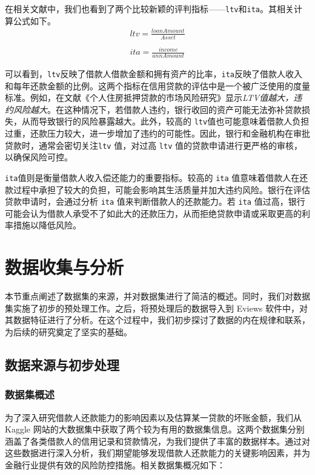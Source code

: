 \documentclass[13.5pt,hyperref,a4paper,UTF8]{ctexart}
\begin{document}
在相关文献中，我们也看到了两个比较新颖的评判指标——\texttt{ltv}和\texttt{ita}。其相关计算公式如下。
\begin{equation}
\begin{split}
    ltv=\frac{loanAmount}{Asset}\\
    \\
    ita=\frac{income}{annAmount}\nonumber
\end{split}
\end{equation}

可以看到，\texttt{ltv}反映了借款人借款金额和拥有资产的比率，\texttt{ita}反映了借款人收入和每年还款金额的比例。这两个指标在信用贷款的评估中是一个被广泛使用的度量标准。例如，在文献《个人住房抵押贷款的市场风险研究》\cite{杨青2011个人住房抵押贷款的市场风险研究}显示\textit{LTV值越大，违约风险越大}。在这种情况下，若借款人违约，银行收回的资产可能无法弥补贷款损失，从而导致银行的风险暴露越大。此外，较高的 \texttt{ltv}值也可能意味着借款人负担过重，还款压力较大，进一步增加了违约的可能性。因此，银行和金融机构在审批贷款时，通常会密切关注\texttt{ltv} 值，对过高 \texttt{ltv} 值的贷款申请进行更严格的审核，以确保风险可控。

\texttt{ita}值则是衡量借款人收入偿还能力的重要指标。较高的 \texttt{ita} 值意味着借款人在还款过程中承担了较大的负担，可能会影响其生活质量并加大违约风险。银行在评估贷款申请时，会通过分析 \texttt{ita} 值来判断借款人的还款能力。若 \texttt{ita} 值过高，银行可能会认为借款人承受不了如此大的还款压力，从而拒绝贷款申请或采取更高的利率措施以降低风险。


\newpage
\section{数据收集与分析} 
本节重点阐述了数据集的来源，并对数据集进行了简洁的概述。同时，我们对数据集实施了初步的预处理工作。之后，将预处理后的数据导入到 Eviews 软件中，对其数据特征进行了分析。在这个过程中，我们初步探讨了数据的内在规律和联系，为后续的研究奠定了坚实的基础。
\subsection{数据来源与初步处理}
\subsubsection{数据集概述}
为了深入研究借款人还款能力的影响因素以及估算某一贷款的坏账金额，我们从 Kaggle 网站的大数据集中获取了两个较为有用的数据集信息。这两个数据集分别涵盖了各类借款人的信用记录和贷款情况，为我们提供了丰富的数据样本。通过对这些数据进行深入分析，我们期望能够发现借款人还款能力的关键影响因素，并为金融行业提供有效的风险防控措施。相关数据集概况如下：
\end{document}
